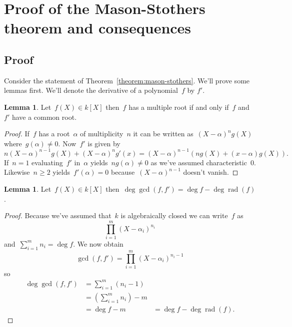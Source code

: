 \documentclass[11pt, a4paper, openany, oneside, article]{memoir}
\theoremstyle{definition}
\newtheorem{lemma}[theorem]{Lemma}
\DeclareMathOperator\rad{rad}
\begin{document}
\section{Proof of the Mason-Stothers theorem and consequences}
\label{section:proof-and-consequences}

\subsection{Proof}

Consider the statement of Theorem~\ref{theorem:mason-stothers}. We'll prove some lemmas first. We'll denote the derivative of a polynomial~$f$ by $f'$.

\begin{lemma}
  Let~$f(X)\in k[X]$ then~$f$ has a multiple root if and only if~$f$ and~$f'$ have a common root.

  \begin{proof}
    If~$f$ has a root~$\alpha$ of multiplicity~$n$ it can be written as~$(X-\alpha)^ng(X)$ where~$g(\alpha)\neq 0$. Now~$f'$ is given by
    \begin{equation}
      n(X-\alpha)^{n-1}g(X)+(X-\alpha)^ng'(x)=(X-\alpha)^{n-1}\left( ng(X)+(x-\alpha)g(X) \right).
    \end{equation}
    If~$n=1$ evaluating~$f'$ in~$\alpha$ yields~$ng(\alpha)\neq 0$ as we've assumed characteristic~$0$. Likewise~$n\geq 2$ yields~$f'(\alpha)=0$ because~$(X-\alpha)^{n-1}$ doesn't vanish.
  \end{proof}
\end{lemma}

\begin{lemma}
  Let~$f(X)\in k[X]$ then~$\deg\gcd(f,f')=\deg f-\deg\rad(f)$.

  \begin{proof}
    Because we've assumed that~$k$ is algebraically closed we can write~$f$ as
    \begin{equation}
      \prod_{i=1}^m(X-\alpha_i)^{n_i}
    \end{equation}
    and~$\sum_{i=1}^mn_i=\deg f$. We now obtain
    \begin{equation}
      \gcd(f,f')=\prod_{i=1}^m(X-\alpha_i)^{n_i-1}
    \end{equation}
    so
    \begin{equation}
      \begin{aligned}
        \deg\gcd(f,f')&=\sum_{i=1}^m(n_i-1) \\
        &=\left( \sum_{i=1}^mn_i \right)-m \\
        &=\deg f-m
        &=\deg f-\deg\rad(f).
      \end{aligned}
    \end{equation}
  \end{proof}
\end{lemma}
\end{document}

